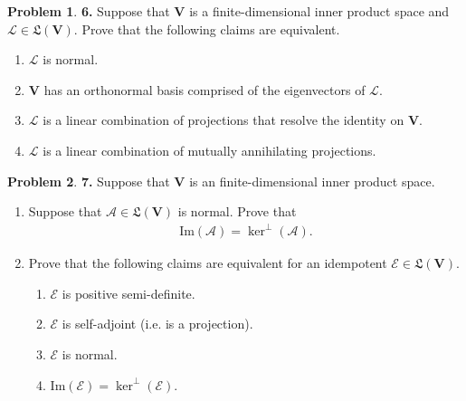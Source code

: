 \documentclass{article}
\theoremstyle{definition}
\newtheorem*{prob*}{Problem}
\newcommand{\V}{\mathbf{V}}
\newcommand{\A}{\mathcal{A}}
\newcommand{\lag}{\mathcal{L}}
\newcommand{\E}{\mathcal{E}}
\newcommand{\ima}{\text{Im}}
\newcommand{\LL}{\mathfrak{L}}
\begin{document}
\newpage




\begin{prob*}\textbf{6.} Suppose that $\V$ is a finite-dimensional inner product space and $\lag \in \LL(\V)$. Prove that the following claims are equivalent.
	\begin{enumerate}
		\item $\lag$ is normal.
		\item $\V$ has an orthonormal basis comprised of the eigenvectors of $\lag$.
		\item $\lag$ is a linear combination of projections that resolve the identity on $\V$.
		\item $\lag$ is a linear combination of mutually annihilating projections.
	\end{enumerate}
	
\end{prob*}




\newpage



\begin{prob*}\textbf{7.} Suppose that $\V$ is an finite-dimensional inner product space. 
	\begin{enumerate}
		\item Suppose that $\A \in \LL(\V)$ is normal. Prove that 
		\begin{align*}
		\ima(\A) = \ker^\perp(\A).
		\end{align*}
		
		\item Prove that the following claims are equivalent for an idempotent $\E \in \LL(\V)$.
		\begin{enumerate}
			\item $\E$ is positive semi-definite.
			\item $\E$ is self-adjoint (i.e. is a projection).
			\item $\E$ is normal.
			\item $\ima(\E) = \ker^\perp(\E)$.
		\end{enumerate}
	\end{enumerate}
	
\end{prob*}


\newpage
\end{document}
